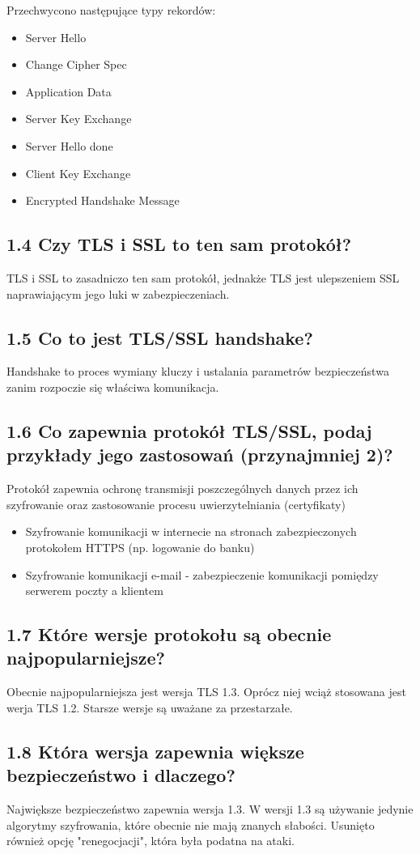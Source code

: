\documentclass{article}
\begin{document}
Przechwycono następujące typy rekordów:
\begin{itemize}
  \item Server Hello
  \item Change Cipher Spec
  \item Application Data
  \item Server Key Exchange
  \item Server Hello done
  \item Client Key Exchange
  \item Encrypted Handshake Message
\end{itemize}
\subsection*{1.4 Czy TLS i SSL to ten sam protokół?}
TLS i SSL to zasadniczo ten sam protokół, jednakże TLS jest ulepszeniem SSL naprawiającym jego luki w zabezpieczeniach.
\subsection*{1.5 Co to jest TLS/SSL handshake?}
Handshake to proces wymiany kluczy i ustalania parametrów bezpieczeństwa zanim rozpoczie się właściwa komunikacja.
\subsection*{1.6 Co zapewnia protokół TLS/SSL, podaj przykłady jego zastosowań (przynajmniej
  2)?}
Protokół zapewnia ochronę transmisji poszczególnych danych przez ich szyfrowanie oraz zastosowanie procesu uwierzytelniania (certyfikaty)
\begin{itemize}
  \item Szyfrowanie komunikacji w internecie na stronach zabezpieczonych protokołem HTTPS (np. logowanie do banku)
  \item Szyfrowanie komunikacji e-mail - zabezpieczenie komunikacji pomiędzy serwerem poczty a klientem
\end{itemize}
\subsection*{1.7 Które wersje protokołu są obecnie najpopularniejsze?}
Obecnie najpopularniejsza jest wersja TLS 1.3. Oprócz niej wciąż stosowana jest werja TLS 1.2. Starsze wersje są uważane za przestarzałe.
\subsection*{1.8 Która wersja zapewnia większe bezpieczeństwo i dlaczego?}
Największe bezpieczeństwo zapewnia wersja 1.3. W wersji 1.3 są używanie jedynie algorytmy szyfrowania, które obecnie nie mają znanych słabości. Usunięto również opcję "renegocjacji", która była podatna na ataki.
\end{document}
